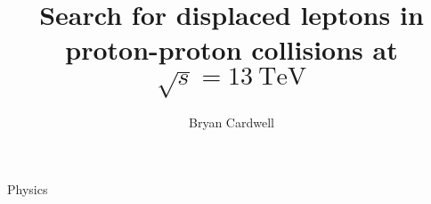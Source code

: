 \documentclass{osudissert96}
\begin{document}
\author{Bryan Cardwell}
\title{Search for displaced leptons in proton-proton collisions at $\sqrt{s}=\SI{13}{\TeV}$}
\unit{Physics}
\maketitle

\disscopyright

\begin{abstract}
  
\end{abstract}

\dedication{For Cristiana and Montague.}
%


\tableofcontents
\listoftables
\listoffigures

\linenumbers







\appendix






\end{document}
